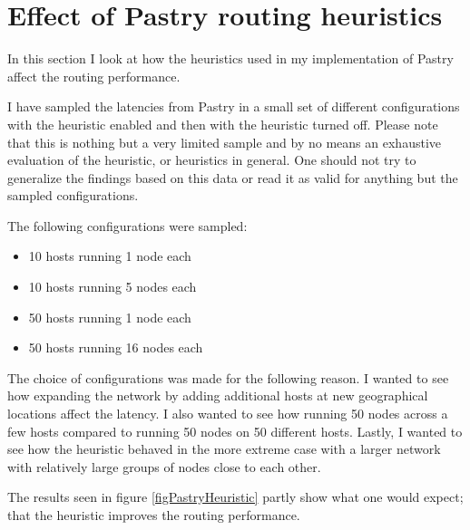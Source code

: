 
\section{Effect of Pastry routing heuristics}
In this section I look at how the heuristics used in my implementation of Pastry affect the routing performance. 

I have sampled the latencies from Pastry in a small set of different configurations with the heuristic enabled and then with the heuristic turned off. Please note that this is nothing but a very limited sample and by no means an exhaustive evaluation of the heuristic, or heuristics in general. One should not try to generalize the findings based on this data or read it as valid for anything but the sampled configurations.

The following configurations were sampled:
\begin{itemize}
\item 10 hosts running 1 node each
\item 10 hosts running 5 nodes each
\item 50 hosts running 1 node each
\item 50 hosts running 16 nodes each
\end{itemize}

The choice of configurations was made for the following reason.
I wanted to see how expanding the network by adding additional hosts at new geographical locations affect the latency.
I also wanted to see how running 50 nodes across a few hosts compared to running 50 nodes on 50 different hosts. Lastly, I wanted to see how the heuristic behaved in the more extreme case with a larger network with relatively large groups of nodes close to each other.

The results seen in figure \ref{figPastryHeuristic} partly show what one would expect; that the heuristic improves the routing performance.

